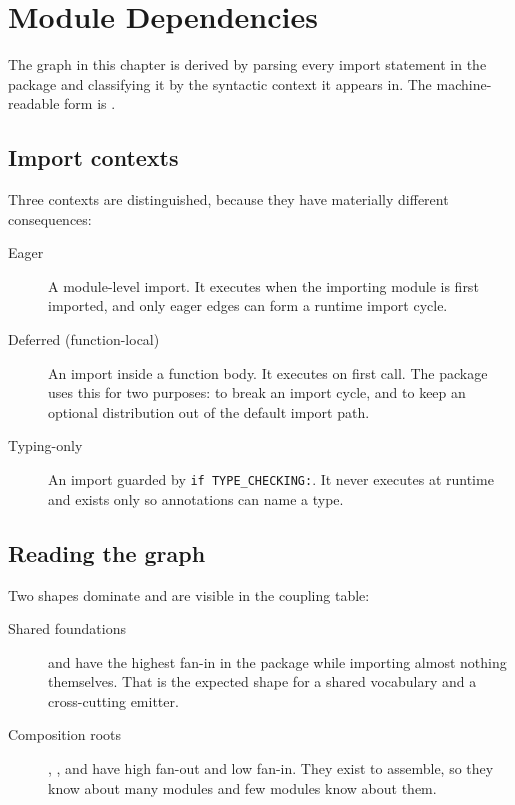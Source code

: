 
\chapter{Module Dependencies}
\label{ch:dependencies}

The graph in this chapter is derived by parsing every import statement in the
package and classifying it by the syntactic context it appears in. The
machine-readable form is .

\section{Import contexts}

Three contexts are distinguished, because they have materially different
consequences:

\begin{description}
  \item[Eager] A module-level import. It executes when the importing module is
    first imported, and only eager edges can form a runtime import cycle.
  \item[Deferred (function-local)] An import inside a function body. It
    executes on first call. The package uses this for two purposes: to break an
    import cycle, and to keep an optional distribution out of the default
    import path.
  \item[Typing-only] An import guarded by \texttt{if TYPE\_CHECKING:}. It never
    executes at runtime and exists only so annotations can name a type.
\end{description}



\section{Reading the graph}

Two shapes dominate and are visible in the coupling table:

\begin{description}
  \item[Shared foundations]  and  have the highest
    fan-in in the package while importing almost nothing themselves. That is
    the expected shape for a shared vocabulary and a cross-cutting emitter.
  \item[Composition roots] , , and  have high
    fan-out and low fan-in. They exist to assemble, so they know about many
    modules and few modules know about them.
\end{description}

